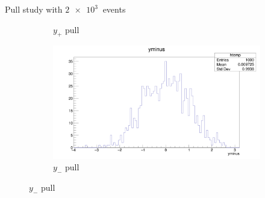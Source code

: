 \documentclass{beamer}
\begin{document}
\begin{frame}{Pull study with $\SI{2e3}{}$ events}
\begin{figure}
\begin{subfigure}{0.5\textwidth}
      \caption{$y_+$ pull}
    \end{subfigure}%
    \begin{subfigure}{0.5\textwidth}
      \includegraphics[width = 1.0\textwidth]{AmplitudePulls/yminus1K1K.png}
      \caption{$y_-$ pull}
    \end{subfigure}
  \end{figure}
\end{frame}
\end{document}
